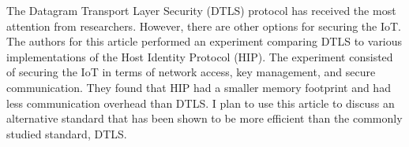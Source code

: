 \documentclass{article}
\newenvironment{annotation}{\begin{addmargin}[2.5em]{0em} \begin{flushleft}}{\end{flushleft} \end{addmargin}}
\begin{document}
\begin{annotation}
The Datagram Transport Layer Security (DTLS) protocol has received the most attention from researchers. However, there are other options for securing the IoT. The authors for this article performed an 
experiment comparing DTLS to various implementations of the Host Identity Protocol (HIP). The experiment consisted of securing the IoT in terms of network access, key management, and secure communication.
They found that HIP had a smaller memory footprint and had less communication overhead than DTLS. I plan to use this article to discuss an alternative standard that has been shown to be more efficient
than the commonly studied standard, DTLS.
\end{annotation}
\end{document}
